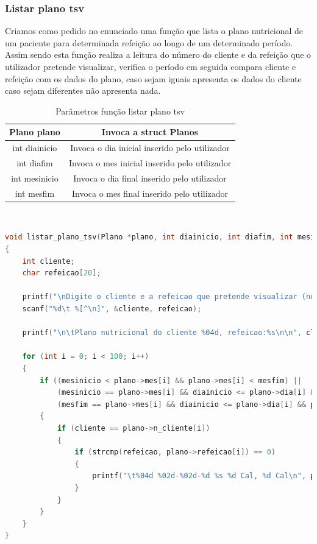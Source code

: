 \documentclass[a4wide]{report}
\begin{document}
\subsubsection{Listar plano tsv}
Criamos como pedido no enunciado uma função que lista o plano nutricional de um paciente para determinada refeição ao longo de um determinado período.
Assim sendo esta função realiza a leitura do número do cliente e da refeição que o utilizador pretende visualizar, verifica o período em seguida compara cliente e refeição com os dados do plano, caso sejam iguais apresenta os dados do cliente caso sejam diferentes não apresenta nada.
\begin{table}[h]
    \centering
    \begin{tabular}{|c|c|} \hline 
         Plano plano& Invoca a struct Planos\\ \hline 
         int diainicio& Invoca o dia inicial inserido pelo utilizador\\ \hline 
         int diafim& Invoca o mes inicial inserido pelo utilizador\\ \hline 
         int mesinicio& Invoca o dia final inserido pelo utilizador\\ \hline 
         int mesfim& Invoca o mes final inserido pelo utilizador\\ \hline
    \end{tabular}
    \caption{Parâmetros função listar plano tsv}
    \label{tab:my_label}
\end{table}
\\
\begin{lstlisting}[language=C, caption={listar plano tsv}, label={codigo:c}, breaklines=true, basicstyle=\small]
void listar_plano_tsv(Plano *plano, int diainicio, int diafim, int mesinicio, int mesfim)
{
    int cliente;
    char refeicao[20];

    printf("\nDigite o cliente e a refeicao que pretende visualizar (numero refeicao):");
    scanf("%d\t %[^\n]", &cliente, refeicao);

    printf("\n\tPlano nutricional do cliente %04d, refeicao:%s\n\n", cliente, refeicao);

    for (int i = 0; i < 100; i++)
    {
        if ((mesinicio < plano->mes[i] && plano->mes[i] < mesfim) ||
            (mesinicio == plano->mes[i] && diainicio <= plano->dia[i] && plano->dia[i] <= diafim) ||
            (mesfim == plano->mes[i] && diainicio <= plano->dia[i] && plano->dia[i] <= diafim))
        {
            if (cliente == plano->n_cliente[i])
            {
                if (strcmp(refeicao, plano->refeicao[i]) == 0)
                {
                    printf("\t%04d %02d-%02d-%d %s %d Cal, %d Cal\n", plano->n_cliente[i], plano->dia[i], plano->mes[i], plano->ano[i], plano->refeicao[i], plano->calorias_min[i], plano->calorias_max[i]);
                }
            }
        }
    }
}
\end{lstlisting}
\newpage
\end{document}
